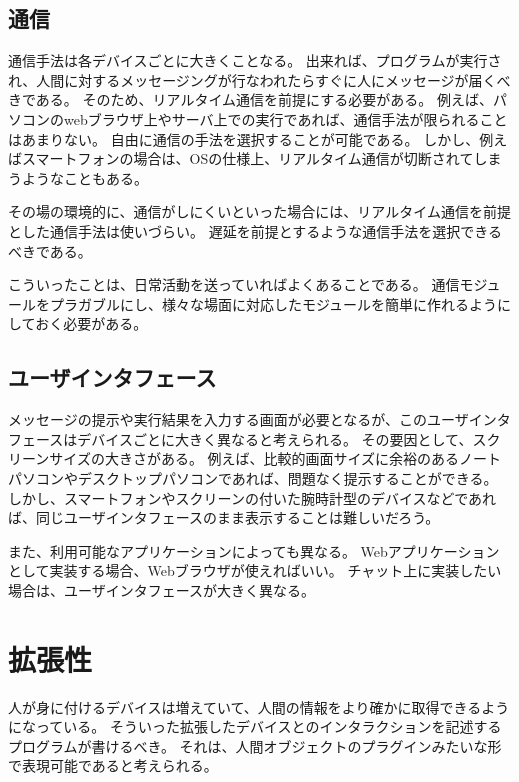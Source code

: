 \subsection{通信}\label{ux901aux4fe1}

通信手法は各デバイスごとに大きくことなる。
出来れば、プログラムが実行され、人間に対するメッセージングが行なわれたらすぐに人にメッセージが届くべきである。
そのため、リアルタイム通信を前提にする必要がある。
例えば、パソコンのwebブラウザ上やサーバ上での実行であれば、通信手法が限られることはあまりない。
自由に通信の手法を選択することが可能である。
しかし、例えばスマートフォンの場合は、OSの仕様上、リアルタイム通信が切断されてしまうようなこともある。

その場の環境的に、通信がしにくいといった場合には、リアルタイム通信を前提とした通信手法は使いづらい。
遅延を前提とするような通信手法を選択できるべきである。

こういったことは、日常活動を送っていればよくあることである。
通信モジュールをプラガブルにし、様々な場面に対応したモジュールを簡単に作れるようにしておく必要がある。

\subsection{ユーザインタフェース}\label{ux30e6ux30fcux30b6ux30a4ux30f3ux30bfux30d5ux30a7ux30fcux30b9}

メッセージの提示や実行結果を入力する画面が必要となるが、このユーザインタフェースはデバイスごとに大きく異なると考えられる。
その要因として、スクリーンサイズの大きさがある。
例えば、比較的画面サイズに余裕のあるノートパソコンやデスクトップパソコンであれば、問題なく提示することができる。
しかし、スマートフォンやスクリーンの付いた腕時計型のデバイスなどであれば、同じユーザインタフェースのまま表示することは難しいだろう。

また、利用可能なアプリケーションによっても異なる。
Webアプリケーションとして実装する場合、Webブラウザが使えればいい。
チャット上に実装したい場合は、ユーザインタフェースが大きく異なる。

\section{拡張性}\label{ux62e1ux5f35ux6027}

人が身に付けるデバイスは増えていて、人間の情報をより確かに取得できるようになっている。
そういった拡張したデバイスとのインタラクションを記述するプログラムが書けるべき。
それは、人間オブジェクトのプラグインみたいな形で表現可能であると考えられる。

